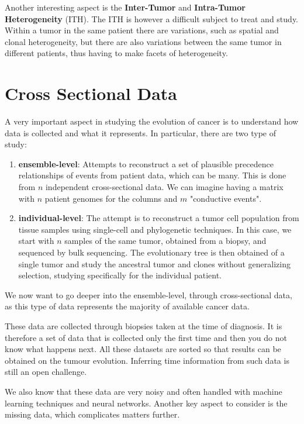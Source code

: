 Another interesting aspect is the \textbf{Inter-Tumor} and \textbf{Intra-Tumor Heterogeneity}
(ITH). The ITH is however a difficult subject to treat and study. Within a tumor in the same
patient there are variations, such as spatial and clonal heterogeneity, but there are also
variations between the same tumor in different patients, thus having to make facets of
heterogeneity.
\section{Cross Sectional Data}
A very important aspect in studying the evolution of cancer is to understand how data is collected
and what it represents. In particular, there are two type of study:
\begin{enumerate}
    \item \textbf{ensemble-level}: Attempts to reconstruct a set of plausible precedence
          relationships of events from patient data, which can be many. This is done from $n$
          independent cross-sectional data. We can imagine having a matrix with $n$ patient
          genomes for the columns and $m$ "conductive events".
    \item \textbf{individual-level}: The attempt is to reconstruct a tumor cell population
          from tissue samples using single-cell and phylogenetic techniques. In this case, we
          start with $n$ samples of the same tumor, obtained from a biopsy, and sequenced by
          bulk sequencing. The evolutionary tree is then obtained of a single tumor and study
          the ancestral tumor and clones without generalizing selection, studying specifically
          for the individual patient.
\end{enumerate}

We now want to go deeper into the ensemble-level, through cross-sectional data, as this type of
data represents the majority of available cancer data.

These data are collected through biopsies taken at the time of diagnosis. It is therefore a set
of data that is collected only the first time and then you do not know what happens next. All
these datasets are sorted so that results can be obtained on the tumour evolution. Inferring
time information from such data is still an open challenge.

We also know that these data are very noisy and often handled with machine learning techniques
and neural networks. Another key aspect to consider is the missing data, which complicates matters
further.


